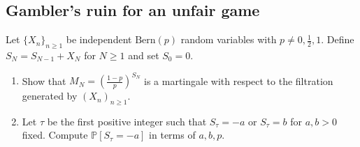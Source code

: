 \documentclass[12pt,reqno]{amsart}
\theoremstyle{definition}
\theoremstyle{remark}
\numberwithin{equation}{section}
\begin{document}
\subsection{Gambler's ruin for an unfair game}\label{subsection:gambler}
Let $\{X_{n}\}_{n\geq1}$ be independent $\mathrm{Bern}(p)$ random variables with $p\neq0,\frac12,1$. Define $S_{N}=S_{N-1}+X_{N}$ for $N\geq1$ and set $S_{0}=0$. 
\begin{enumerate}
\item Show that $M_{N}=\left(\frac{1-p}{p}\right)^{S_{N}}$ is a martingale with respect to the filtration generated by $(X_{n})_{n\geq1}$.
\item Let $\tau$ be the first positive integer such that $S_{\tau}=-a$ or $S_{\tau}=b$ for $a,b>0$ fixed. Compute $\mathbb{P}[S_{\tau}=-a]$ in terms of $a,b,p$.
\end{enumerate}
\begin{comment}
\subsection{Trigonometry is very important for studying stochastic processes}
Keep the notation of Problem \ref{subsection:gambler}, but suppose now that $p=\frac12$. 
\begin{enumerate}
\item Define $Y_{N}=\frac{\cos\left[\lambda\left(S_{N}-\frac{b-a}{2}\right)\right]}{(\cos\lambda)^{N}}$, where $a,b>0$ (suppose that $\cos\lambda\neq0$). Show that $Y_{N}$ is a martingale with respect to the filtration generated by $(X_{n})_{n\geq1}$.
\item Let $\tau$ be the first time that $S_{\tau}=-	1$ or $S_{\tau}=1$. Show that 
%
\begin{align*}
\E\left[\frac{\cos[\lambda S_{\tau}]}{(\cos\lambda)^{\tau}}\right]=1.
\end{align*}
%
(\emph{Remember to check conditions of any theorem you may want use to make sure it applies!})
\item Deduce that $\E[(\cos\lambda)^{-\tau}]=(\cos\lambda)^{-1}$.
\end{enumerate}
\end{comment}
\end{document}
